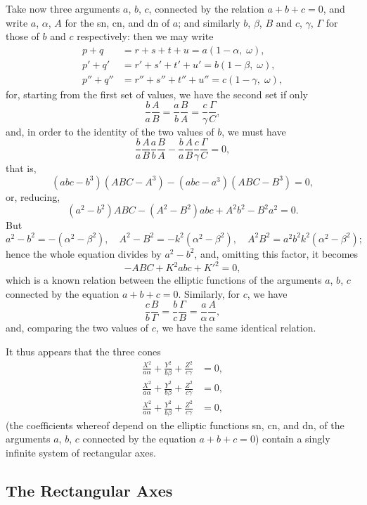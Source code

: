 \documentclass[11pt,a4paper]{book}
\begin{document}
Take now three arguments $a$, $b$, $c$, connected by the relation $a+b+c=0$, and write $a$, $\alpha$, $A$ for the sn, cn, and dn of $a$; and similarly $b$, $\beta$, $B$ and $c$, $\gamma$, $\Gamma$ for those of $b$ and $c$ respectively: then we may write
\begin{align*}
p+q &= r+s+t+u = a(1-\alpha,\; \omega),\\
p'+q' &= r'+s'+t'+u' = b(1-\beta,\; \omega),\\
p''+q'' &= r''+s''+t''+u'' = c(1-\gamma,\; \omega),
\end{align*}
for, starting from the first set of values, we have the second set if only
\[
\frac{b}{a}\frac{A}{B} = \frac{a}{b}\frac{B}{A} = \frac{c}{\gamma}\frac{\Gamma}{C},
\]
and, in order to the identity of the two values of $b$, we must have
\[
\frac{b}{a}\frac{A}{B}\frac{a}{b}\frac{B}{A} - \frac{b}{a}\frac{A}{B}\frac{c}{\gamma}\frac{\Gamma}{C} = 0,
\]
that is,
\[
(abc - b^{3})(ABC - A^{3}) - (abc - a^{3})(ABC - B^{3}) = 0,
\]
or, reducing,
\[
(a^{2} - b^{2})ABC - (A^{2} - B^{2})abc + A^{2}b^{2} - B^{2}a^{2} = 0.
\]
But
\[
a^{2} - b^{2} = -(\alpha^{2} - \beta^{2}),\quad A^{2} - B^{2} = -k^{2}(\alpha^{2} - \beta^{2}),\quad A^{2}B^{2} = a^{2}b^{2}k^{2}(\alpha^{2} - \beta^{2});
\]
hence the whole equation divides by $a^{2} - b^{2}$, and, omitting this factor, it becomes
\[
-ABC + K^{2}abc + K'^{2} = 0,
\]
which is a known relation between the elliptic functions of the arguments $a$, $b$, $c$ connected by the equation $a+b+c=0$. Similarly, for $c$, we have
\[
\frac{c}{b}\frac{B}{\Gamma} = \frac{b}{c}\frac{\Gamma}{B} = \frac{a}{\alpha}\frac{A}{\alpha},
\]
and, comparing the two values of $c$, we have the same identical relation.

It thus appears that the three cones
\begin{align*}
\frac{X^{2}}{a\alpha} + \frac{Y^{2}}{b\beta} + \frac{Z^{2}}{c\gamma} &= 0,\\
\frac{X^{2}}{a\alpha} + \frac{Y^{2}}{b\beta} + \frac{Z^{2}}{c\gamma} &= 0,\\
\frac{X^{2}}{a\alpha} + \frac{Y^{2}}{b\beta} + \frac{Z^{2}}{c\gamma} &= 0,
\end{align*}
(the coefficients whereof depend on the elliptic functions sn, cn, and dn, of the arguments $a$, $b$, $c$ connected by the equation $a+b+c=0$) contain a singly infinite system of rectangular axes.

\subsection*{The Rectangular Axes}
\end{document}
